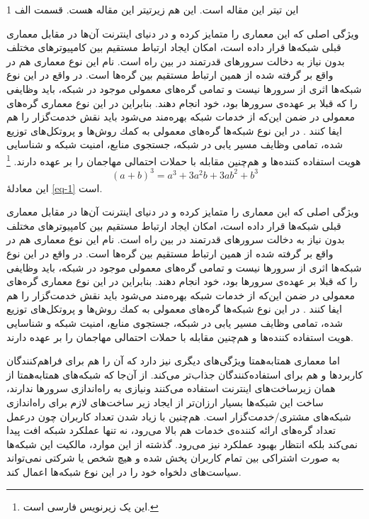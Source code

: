 \documentclass[12pt,twoside]{xepersian-magazine}
\begin{document}
\begin{article}{2}
	{این تیتر این مقاله است.}
	{این هم زیرتیتر این مقاله هست.}
	{قسمت الف}
	{1}



		
\noindent{}
ويژگی اصلی که اين معماری را متمايز کرده و در دنيای اينترنت آن‌ها در مقابل معماری قبلی شبكه‌ها قرار داده است، امكان ايجاد ارتباط مستقيم  بين كامپيوترهای مختلف بدون نياز به دخالت سرورهای قدرتمند در بين راه است.  نام‌ اين نوع معماری هم در واقع بر گرفته شده از همین  ارتباط مستقیم بين گره‌ها است.  در واقع در اين نوع شبكه‌ها اثری از سرورها نيست و تمامی گره‌های معمولی موجود در شبكه، بايد وظايفی را که قبلا بر عهده‌ی سرورها بود، خود انجام دهند. بنابراين در اين نوع معماری گره‌های معمولی در ضمن اين‌که از خدمات شبکه بهره‌مند می‌شود بايد نقش خدمت‌گزار را هم ايفا کنند . در اين نوع شبکه‌ها گره‌های معمولی به كمك روش‌ها و پروتكل‌های توزيع شده، تمامی وظايف  مسير يابی در شبكه، جستجوی منابع، امنيت شبكه و شناسايی هويت استفاده كننده‌ها و هم‌چنين مقابله با حملات احتمالی مهاجمان را بر عهده دارند.
\footnote{این یک زیرنویس فارسی است.}
\begin{equation}
(a+b)^3=a^3+3a^2b+3ab^2+b^3\label{eq-1}
\end{equation}
این معادلهٔ \eqref{eq-1} است.

ويژگی اصلی که اين معماری را متمايز کرده و در دنيای اينترنت آن‌ها در مقابل معماری قبلی شبكه‌ها قرار داده است، امكان ايجاد ارتباط مستقيم  بين كامپيوترهای مختلف بدون نياز به دخالت سرورهای قدرتمند در بين راه است.  نام‌ اين نوع معماری هم در واقع بر گرفته شده از همین  ارتباط مستقیم بين گره‌ها است.  در واقع در اين نوع شبكه‌ها اثری از سرورها نيست و تمامی گره‌های معمولی موجود در شبكه، بايد وظايفی را که قبلا بر عهده‌ی سرورها بود، خود انجام دهند. بنابراين در اين نوع معماری گره‌های معمولی در ضمن اين‌که از خدمات شبکه بهره‌مند می‌شود بايد نقش خدمت‌گزار را هم ايفا کنند . در اين نوع شبکه‌ها گره‌های معمولی به كمك روش‌ها و پروتكل‌های توزيع شده، تمامی وظايف  مسير يابی در شبكه، جستجوی منابع، امنيت شبكه و شناسايی هويت استفاده كننده‌ها و هم‌چنين مقابله با حملات احتمالی مهاجمان را بر عهده دارند.

اما معماری همتابه‌همتا ويژگی‌های ديگری نيز دارد که آن را هم برای فراهم‌کنندگان کاربردها و هم برای استفاده‌کنندگان جذاب‌تر می‌کند.  از آن‌جا که شبکه‌های همتابه‌همتا از همان زيرساخت‌های اينترنت استفاده می‌کنند ونيازی به راه‌اندازی سرورها ندارند، ساخت اين شبكه‌ها بسيار ارزان‌تر از ايجاد زير ساخت‌های لازم برای راه‌اندازی شبكه‌های مشتری/خدمت‌گزار است.  هم‌چنين با زياد شدن تعداد کاربران چون درعمل تعداد گره‌های ارائه کننده‌ی خدمات هم بالا می‌رود، نه تنها عملكرد شبكه افت پيدا نمی‌كند بلكه انتظار بهبود عملکرد نيز می‌رود. گذشته از اين موارد، مالكيت اين شبكه‌ها به صورت اشتراكی بين تمام کاربران پخش شده و هيچ شخص يا شركتی نمی‌تواند سياست‌های دلخواه خود را در اين نوع شبكه‌ها اعمال کند.


\end{article}
\end{document}
